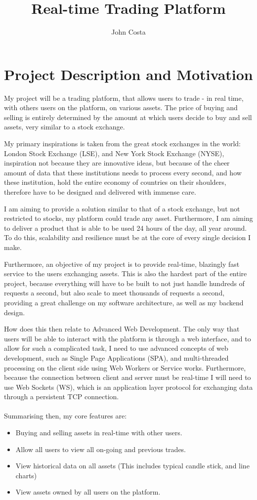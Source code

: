\documentclass[titlepage]{article}
\title{Real-time Trading Platform}
\author{John Costa}
\begin{document}
\maketitle

\section{Project Description and Motivation}
	My project will be a trading platform, that allows users to trade - in real time, with others users on the platform, on various assets. The price of buying and selling is entirely determined by the amount at which users decide to buy and sell assets, very similar to a stock exchange.
	
	My primary inspirations is taken from the great stock exchanges in the world: London Stock Exchange (LSE), and New York Stock Exchange (NYSE), inspiration not because they are innovative ideas, but because of the cheer amount of data that these institutions needs to process every second, and how these institution, hold the entire economy of countries on their shoulders, therefore have to be designed and delivered with immense care.
	
	I am aiming to provide a solution similar to that of a stock exchange, but not restricted to stocks, my platform could trade any asset. Furthermore, I am aiming to deliver a product that is able to be used 24 hours of the day, all year around. To do this, scalability and resilience must be at the core of every single decision I make.

	Furthermore, an objective of my project is to provide real-time, blazingly fast service to the users exchanging assets. This is also the hardest part of the entire project, because everything will have to be built to not just handle hundreds of requests a second, but also scale to meet thousands of requests a second, providing a great challenge on my software architecture, as well as my backend design.

	How does this then relate to Advanced Web Development. The only way that users will be able to interact with the platform is through a web interface, and to allow for such a complicated task, I need to use advanced concepts of web development, such as Single Page Applications (SPA), and multi-threaded processing on the client side using Web Workers or Service works. Furthermore, because the connection between client and server must be real-time I will need to use Web Sockets (WS), which is an application layer protocol for exchanging data through a persistent TCP connection. \\
	\\
	Summarising then, my core features are:
	\begin{itemize}
		\item Buying and selling assets in real-time with other users.
		\item Allow all users to view all on-going and previous trades.
		\item View historical data on all assets (This includes typical candle stick, and line charts)
		\item View assets owned by all users on the platform.
	\end{itemize}
\end{document}

